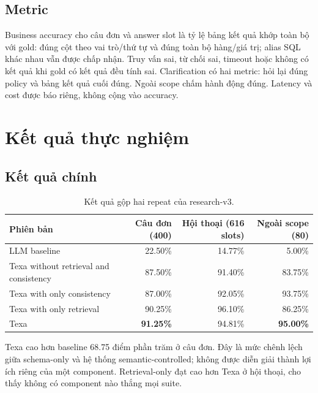 \documentclass[11pt,a4paper]{article}
\begin{document}
\subsection{Metric}
Business accuracy cho câu đơn và answer slot là tỷ lệ bảng kết quả khớp toàn bộ với gold: đúng cột theo vai trò/thứ tự và đúng toàn bộ hàng/giá trị; alias SQL khác nhau vẫn được chấp nhận. Truy vấn sai, từ chối sai, timeout hoặc không có kết quả khi gold có kết quả đều tính sai. Clarification có hai metric: hỏi lại đúng policy và bảng kết quả cuối đúng. Ngoài scope chấm hành động đúng. Latency và cost được báo riêng, không cộng vào accuracy.

\section{Kết quả thực nghiệm}
\subsection{Kết quả chính}
\begin{table}[H]\centering\small\caption{Kết quả gộp hai repeat của research-v3.}\begin{tabular}{lrrr}\toprule Phiên bản & Câu đơn (400) & Hội thoại (616 slots) & Ngoài scope (80)\\\midrule LLM baseline & 22.50\% & 14.77\% & 5.00\%\\ Texa without retrieval and consistency & 87.50\% & 91.40\% & 83.75\%\\ Texa with only consistency & 87.00\% & 92.05\% & 93.75\%\\ Texa with only retrieval & 90.25\% & 96.10\% & 86.25\%\\\rowcolor{pale} Texa & \textbf{91.25\%} & 94.81\% & \textbf{95.00\%}\\\bottomrule\end{tabular}\end{table}
Texa cao hơn baseline 68.75 điểm phần trăm ở câu đơn. Đây là mức chênh lệch giữa schema-only và hệ thống semantic-controlled; không được diễn giải thành lợi ích riêng của một component. Retrieval-only đạt cao hơn Texa ở hội thoại, cho thấy không có component nào thắng mọi suite.
\end{document}
